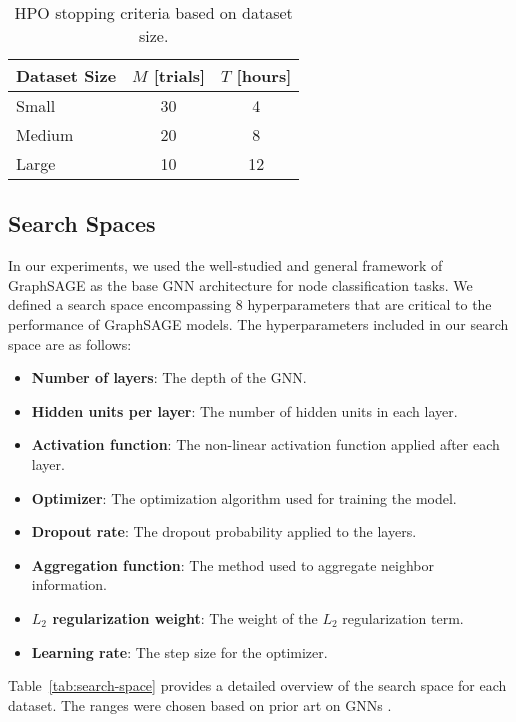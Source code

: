 \begin{table}[h]
	\caption{HPO stopping criteria based on dataset size.}
	\label{tab:stopping-criteria}
	\centering
	\begin{tabular}{lcc}
		\toprule
		Dataset Size & \( M \) [trials] & \( T \) [hours] \\
		\midrule
		Small        & 30               & 4               \\
		Medium       & 20               & 8               \\
		Large        & 10               & 12              \\
		\bottomrule
	\end{tabular}
\end{table}

\subsection{Search Spaces}

In our experiments, we used the well-studied and general framework of GraphSAGE \cite{hamilton_inductive_2017} as the base GNN architecture for node classification tasks. We defined a search space encompassing 8 hyperparameters that are critical to the performance of GraphSAGE models. The hyperparameters included in our search space are as follows:
\begin{itemize}
	\item \textbf{Number of layers}: The depth of the GNN.
	\item \textbf{Hidden units per layer}: The number of hidden units in each layer.
	\item \textbf{Activation function}: The non-linear activation function applied after each layer.
	\item \textbf{Optimizer}: The optimization algorithm used for training the model.
	\item \textbf{Dropout rate}: The dropout probability applied to the layers.
	\item \textbf{Aggregation function}: The method used to aggregate neighbor information.
	\item \textbf{\( L_2 \) regularization weight}: The weight of the \( L_2 \) regularization term.
	\item \textbf{Learning rate}: The step size for the optimizer.
\end{itemize}
Table~\ref{tab:search-space} provides a detailed overview of the search space for each dataset. The ranges were chosen based on prior art on GNNs \cite{bronstein_geometric_2021, hamilton_inductive_2017, zeng_graphsaint_2019, zhu_beyond_2020, yang_vqgraph_2023, den_boef_graphpope_2021, li_finding_2022}.

